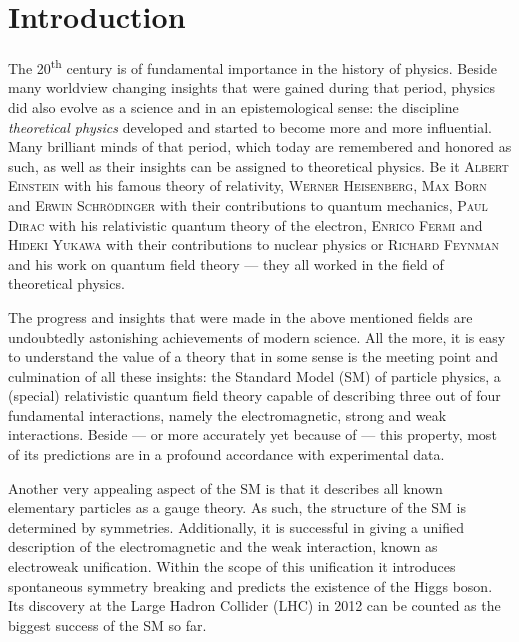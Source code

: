 \documentclass[a4paper,12pt]{book}
\begin{document}
\chapter{Introduction}
The 20\textsuperscript{th} century is of fundamental importance in the history of physics. Beside many worldview changing insights that were gained during that period, physics did also evolve as a science and in an epistemological sense: the discipline \textit{theoretical physics} developed and started to become more and more influential. Many brilliant minds of that period, which today are remembered and honored as such, as well as their insights can be assigned to theoretical physics. Be it \textsc{Albert Einstein} with his famous theory of relativity, \textsc{Werner Heisenberg}, \textsc{Max Born} and \textsc{Erwin Schrödinger} with their contributions to quantum mechanics, \textsc{Paul Dirac} with his relativistic quantum theory of the electron, \textsc{Enrico Fermi} and \textsc{Hideki Yukawa} with their contributions to nuclear physics or \textsc{Richard Feynman} and his work on quantum field theory --- they all worked in the field of theoretical physics.\par
The progress and insights that were made in the above mentioned fields are undoubtedly astonishing achievements of modern science. All the more, it is easy to understand the value of a theory that in some sense is the meeting point and culmination of all these insights: the Standard Model (SM) of particle physics, a (special) relativistic quantum field theory capable of describing three out of four fundamental interactions, namely the electromagnetic, strong and weak interactions. Beside --- or more accurately yet because of --- this property, most of its predictions are in a profound accordance with experimental data.\par
Another very appealing aspect of the SM is that it describes all known elementary particles as a gauge theory. As such, the structure of the SM is determined by symmetries. Additionally, it is successful in giving a unified description of the electromagnetic and the weak interaction, known as electroweak unification. Within the scope of this unification it introduces spontaneous symmetry breaking and predicts the existence of the Higgs boson. Its discovery at the Large Hadron Collider (LHC) in 2012 \cite{higgsmeasurement1,higgsmeasurement2} can be counted as the biggest success of the SM so far.\par
\end{document}
